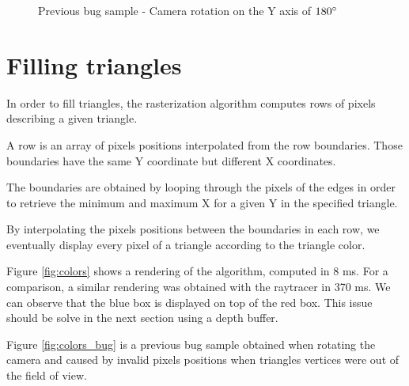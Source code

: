 \begin{figure}[H]
    \caption{Previous bug sample - Camera rotation on the Y axis of $180 \degree$}
    \label{fig:bug2}
\endminipage
\end{figure}


\section{Filling triangles}

In order to fill triangles, the rasterization algorithm computes rows of pixels describing a given triangle.

A row is an array of pixels positions interpolated from the row boundaries. Those boundaries have the same Y coordinate but different X coordinates.

The boundaries are obtained by looping through the pixels of the edges in order to retrieve the minimum and maximum X for a given Y in the specified triangle.

By interpolating the pixels positions between the boundaries in each row, we eventually display every pixel of a triangle according to the triangle color.

Figure \ref{fig:colors} shows a rendering of the algorithm, computed in 8 ms. For a comparison, a similar rendering was obtained with the raytracer in 370 ms. We can observe that the blue box is displayed on top of the red box. This issue should be solve in the next section using a depth buffer.

Figure \ref{fig:colors_bug} is a previous bug sample obtained when rotating the camera and caused by invalid pixels positions when triangles vertices were out of the field of view.

